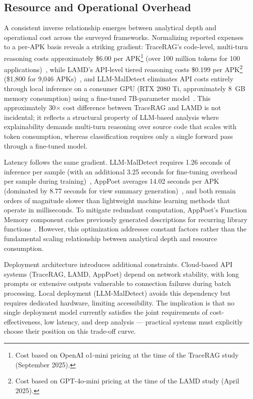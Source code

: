 \subsection{Resource and Operational Overhead}

A consistent inverse relationship emerges between analytical depth and operational cost across the surveyed frameworks. Normalizing reported expenses to a per-APK basis reveals a striking gradient: TraceRAG's code-level, multi-turn reasoning costs approximately \$6.00 per APK\footnote{Cost based on OpenAI o1-mini pricing at the time of the TraceRAG study (September 2025).} (over 100 million tokens for 100 applications)~\cite{Zhang2025-ot}, while LAMD's API-level tiered reasoning costs \$0.199 per APK\footnote{Cost based on GPT-4o-mini pricing at the time of the LAMD study (April 2025).} (\$1,800 for 9,046 APKs)~\cite{Qian2025-ua}, and LLM-MalDetect eliminates API costs entirely through local inference on a consumer GPU (RTX 2080 Ti, approximately 8~GB memory consumption) using a fine-tuned 7B-parameter model~\cite{Feng2025-ry}. This approximately 30$\times$ cost difference between TraceRAG and LAMD is not incidental; it reflects a structural property of LLM-based analysis where explainability demands multi-turn reasoning over source code that scales with token consumption, whereas classification requires only a single forward pass through a fine-tuned model.

Latency follows the same gradient. LLM-MalDetect requires 1.26 seconds of inference per sample (with an additional 3.25 seconds for fine-tuning overhead per sample during training)~\cite{Feng2025-ry}, AppPoet averages 14.02 seconds per APK (dominated by 8.77 seconds for view summary generation)~\cite{Zhao2024-dw}, and both remain orders of magnitude slower than lightweight machine learning methods that operate in milliseconds. To mitigate redundant computation, AppPoet's Function Memory component caches previously generated descriptions for recurring library functions~\cite{Zhao2024-dw}. However, this optimization addresses constant factors rather than the fundamental scaling relationship between analytical depth and resource consumption.

Deployment architecture introduces additional constraints. Cloud-based API systems (TraceRAG, LAMD, AppPoet) depend on network stability, with long prompts or extensive outputs vulnerable to connection failures during batch processing. Local deployment (LLM-MalDetect) avoids this dependency but requires dedicated hardware, limiting accessibility. The implication is that no single deployment model currently satisfies the joint requirements of cost-effectiveness, low latency, and deep analysis --- practical systems must explicitly choose their position on this trade-off curve.

